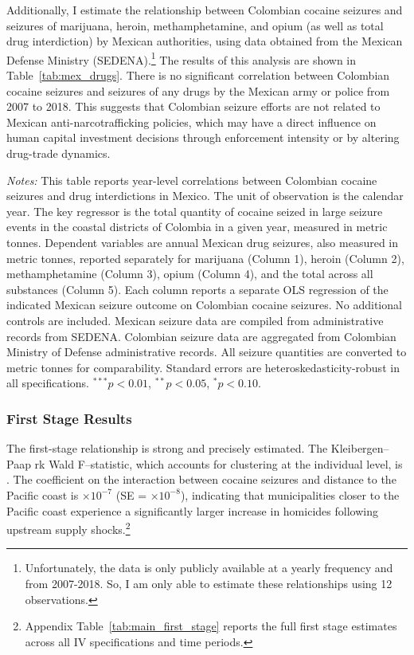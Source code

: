 \documentclass[12pt,letter,english,intoc,bibliography=totoc,index=totoc,BCOR10mm,captions=tableheading,nottitlepage,fleqn]{article}
\theoremstyle{break}
\begin{document}
Additionally, I estimate the relationship between Colombian cocaine seizures and seizures of marijuana, heroin, methamphetamine, and opium (as well as total drug interdiction) by Mexican authorities, using data obtained from the Mexican Defense Ministry (SEDENA).\footnote{Unfortunately, the data is only publicly available at a yearly frequency and from 2007-2018. So, I am only able to estimate these relationships using 12 observations.} The results of this analysis are shown in Table~\ref{tab:mex_drugs}. There is no significant correlation between Colombian cocaine seizures and seizures of any drugs by the Mexican army or police from 2007 to 2018. This suggests that Colombian seizure efforts are not related to Mexican anti-narcotrafficking policies, which may have a direct influence on human capital investment decisions through enforcement intensity or by altering drug-trade dynamics.
\begin{table}[H]
\centering
\scriptsize
\caption{Correlation Between Colombian Seizures and Mexican Drug Interdiction Efforts}
\label{tab:mex_drugs}
\centering

\begin{minipage}{0.95\linewidth}
    \scriptsize \singlespacing
    \textit{Notes:} This table reports year-level correlations between Colombian cocaine seizures and drug interdictions in Mexico. The unit of observation is the calendar year. The key regressor is the total quantity of cocaine seized in large seizure events in the coastal districts of Colombia in a given year, measured in metric tonnes. Dependent variables are annual Mexican drug seizures, also measured in metric tonnes, reported separately for marijuana (Column 1), heroin (Column 2), methamphetamine (Column 3), opium (Column 4), and the total across all substances (Column 5). Each column reports a separate OLS regression of the indicated Mexican seizure outcome on Colombian cocaine seizures. No additional controls are included. Mexican seizure data are compiled from administrative records from SEDENA. Colombian seizure data are aggregated from Colombian Ministry of Defense administrative records. All seizure quantities are converted to metric tonnes for comparability. Standard errors are heteroskedasticity-robust in all specifications. $^{***}p<0.01$, $^{**}p<0.05$, $^{*}p<0.10$.
    \end{minipage}
\end{table}

\subsubsection*{First Stage Results}
The first-stage relationship is strong and precisely estimated. The Kleibergen--Paap rk Wald F--statistic, which accounts for clustering at the individual level, is \Fstat. The coefficient on the interaction between cocaine seizures and distance to the Pacific coast is $\times 10^{-7}$ (SE = $\times 10^{-8}$), indicating that municipalities closer to the Pacific coast experience a significantly larger increase in homicides following upstream supply shocks.\footnote{Appendix Table~\ref{tab:main_first_stage} reports the full first stage estimates across all IV specifications and time periods.}
\end{document}
